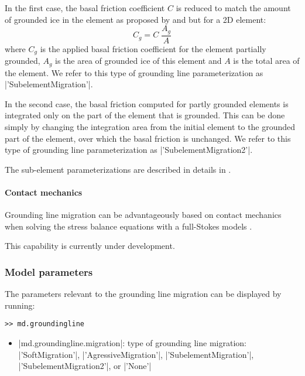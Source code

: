 In the first case, the basal friction coefficient $C$ is reduced to match the amount of grounded ice in the element as proposed by \cite{Pattyn2006} and \cite{Gladstone2010} but for a 2D element:
\begin{equation}
	C_g = C \;\frac{A_g}{A}
\end{equation}
where $C_g$ is the applied basal friction coefficient for the element partially grounded, $A_g$ is the area of grounded ice of this element and $A$ is the total area of the element. We refer to this type of grounding line parameterization as \lstinlinebg|'SubelementMigration'|.

In the second case, the basal friction computed for partly grounded elements is integrated only on the part of the element that is grounded. This can be done simply by changing the integration area from the initial element to the grounded part of the element, over which the basal friction is unchanged. We refer to this type of grounding line parameterization as \lstinlinebg|'SubelementMigration2'|.

The sub-element parameterizations are described in details in \cite{Seroussi2014a}.

\paragraph{Contact mechanics}
Grounding line migration can be advantageously based on contact mechanics when solving the stress balance equations with a full-Stokes models \citep{Nowicki2008,Durand2009}.

This capability is currently under development.

\subsubsection{Model parameters}
The parameters relevant to the grounding line migration can be displayed by running:
\begin{lstlisting}
>> md.groundingline
\end{lstlisting}

\begin{itemize}
	\item \lstinlinebg|md.groundingline.migration|: type of grounding line migration:
		\lstinlinebg|'SoftMigration'|, \lstinlinebg|'AgressiveMigration'|, \lstinlinebg|'SubelementMigration'|, \lstinlinebg|'SubelementMigration2'|, or \lstinlinebg|'None'|
\end{itemize}

